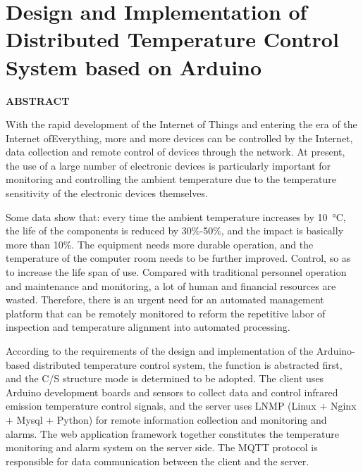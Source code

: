 \clearpage
{}
\thispagestyle{abstractStyleEn} 

\section*{\songti{} \centering \textbf{Design and Implementation of Distributed Temperature Control System based on Arduino}}

\begin{center}
	\textbf{ABSTRACT}
\end{center}
\vspace{2em}

With the rapid development of the Internet of Things and entering the era of the Internet ofEverything, more and more devices can be controlled by the Internet, data collection and remote control of devices through the network. At present, the use of a large number of electronic devices is particularly important for monitoring and controlling the ambient temperature due to the temperature sensitivity of the electronic devices themselves.

Some data show that: every time the ambient temperature increases by \SI{10}{\degreeCelsius}, the life of the components is reduced by 30\%-50\%, and the impact is basically more than 10\%. The equipment needs more durable operation, and the temperature of the computer room needs to be further improved. Control, so as to increase the life span of use. Compared with traditional personnel operation and maintenance and monitoring, a lot of human and financial resources are wasted. Therefore, there is an urgent need for an automated management platform that can be remotely monitored to reform the repetitive labor of inspection and temperature alignment into automated processing.

According to the requirements of the design and implementation of the Arduino-based distributed temperature control system, the function is abstracted first, and the C/S structure mode is determined to be adopted. The client uses Arduino development boards and sensors to collect data and control infrared emission temperature control signals, and the server uses LNMP (Linux + Nginx + Mysql + Python) for remote information collection and monitoring and alarms. The web application framework together constitutes the temperature monitoring and alarm system on the server side. The MQTT protocol is responsible for data communication between the client and the server.

